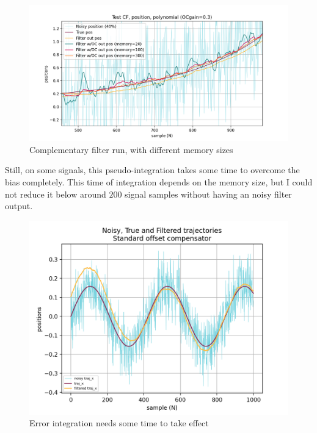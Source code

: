 \documentclass[a4paper,10pt]{article}
\begin{document}
\begin{figure}[H]
\label{fig:complementary_filter_run_memory_comparison}
\centering
  \includegraphics[width=\linewidth, angle=0, scale=1.1]{./images/TestCF_run14_polynomial.png}
  \caption{Complementary filter run, with different memory sizes}
\end{figure}

Still, on some signals, this pseudo-integration takes some time to overcome the bias completely. This time of integration depends on the memory size, but I could not reduce it below around $200$ signal samples without having an noisy filter output. 

\begin{figure}[H]
\label{fig:complementary_filter_run_intration_time}
\centering
  \includegraphics[width=\linewidth, angle=0, scale=0.8]{./images/CF_test_sinus_1_Standard.png}
  \caption{Error integration needs some time to take effect}
\end{figure}
\end{document}
